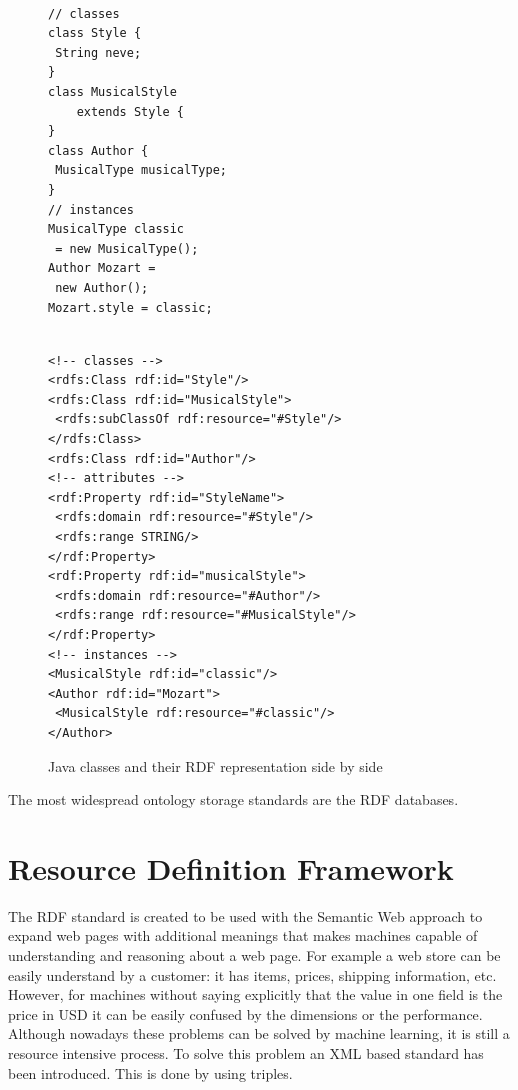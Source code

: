 \begin{figure}
        \centering
        \begin{minipage}[b]{0.4\textwidth}
\begin{verbatim}

// classes
class Style {
 String neve;
}
class MusicalStyle 
	extends Style {
}
class Author {
 MusicalType musicalType;
}
// instances
MusicalType classic
 = new MusicalType();
Author Mozart =
 new Author();
Mozart.style = classic;
\end{verbatim}

        \end{minipage}
        \begin{minipage}[b]{0.4\textwidth}
        \begin{verbatim}

<!-- classes -->
<rdfs:Class rdf:id="Style"/>
<rdfs:Class rdf:id="MusicalStyle">
 <rdfs:subClassOf rdf:resource="#Style"/>
</rdfs:Class>
<rdfs:Class rdf:id="Author"/>
<!-- attributes -->
<rdf:Property rdf:id="StyleName">
 <rdfs:domain rdf:resource="#Style"/>
 <rdfs:range STRING/>
</rdf:Property>
<rdf:Property rdf:id="musicalStyle">
 <rdfs:domain rdf:resource="#Author"/>
 <rdfs:range rdf:resource="#MusicalStyle"/>
</rdf:Property>
<!-- instances -->
<MusicalStyle rdf:id="classic"/>
<Author rdf:id="Mozart">
 <MusicalStyle rdf:resource="#classic"/>
</Author>               
\end{verbatim}

        \end{minipage} 
 \caption{Java classes and their RDF representation side by side}
                \label{fig:rdf}
\end{figure}
The most widespread ontology storage standards are the RDF databases.

\section{Resource Definition Framework}

The RDF standard\cite{rdf} is created to be used with the Semantic Web approach to expand web pages with additional meanings that makes machines capable of understanding and reasoning about a web page. For example a web store can be easily understand by a customer: it has items, prices, shipping information, etc. However, for machines without saying explicitly that the value in one field is the price in USD it can be easily confused by the dimensions or the performance. Although nowadays these problems can be solved by machine learning, it is still a resource intensive process. To solve this problem an XML based standard has been introduced. This is done by using triples. 


